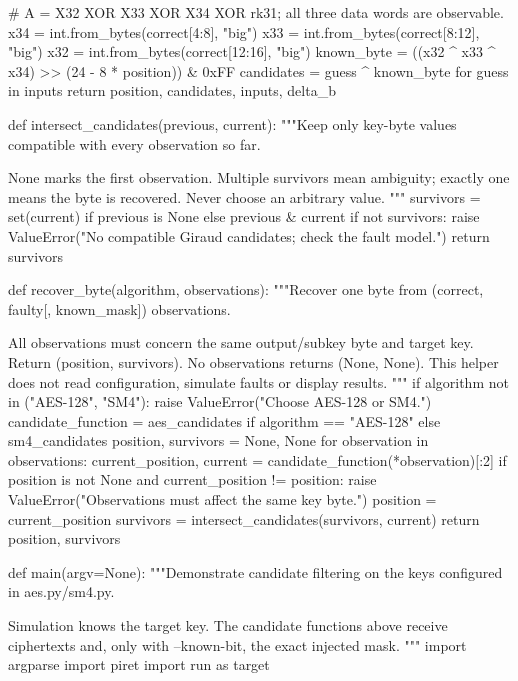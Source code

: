 \begin{lightcode}[numbers=left,firstnumber=1]
    # A = X32 XOR X33 XOR X34 XOR rk31; all three data words are observable.
    x34 = int.from_bytes(correct[4:8], "big")
    x33 = int.from_bytes(correct[8:12], "big")
    x32 = int.from_bytes(correct[12:16], "big")
    known_byte = ((x32 ^ x33 ^ x34) >> (24 - 8 * position)) & 0xFF
    candidates = {guess ^ known_byte for guess in inputs}
    return position, candidates, inputs, delta_b


def intersect_candidates(previous, current):
    """Keep only key-byte values compatible with every observation so far.

    None marks the first observation. Multiple survivors mean ambiguity;
    exactly one means the byte is recovered. Never choose an arbitrary value.
    """
    survivors = set(current) if previous is None else previous & current
    if not survivors:
        raise ValueError("No compatible Giraud candidates; check the fault model.")
    return survivors


def recover_byte(algorithm, observations):
    """Recover one byte from (correct, faulty[, known_mask]) observations.

    All observations must concern the same output/subkey byte and target key.
    Return (position, survivors). No observations returns (None, None).
    This helper does not read configuration, simulate faults or display results.
    """
    if algorithm not in ("AES-128", "SM4"):
        raise ValueError("Choose AES-128 or SM4.")
    candidate_function = aes_candidates if algorithm == "AES-128" else sm4_candidates
    position, survivors = None, None
    for observation in observations:
        current_position, current = candidate_function(*observation)[:2]
        if position is not None and current_position != position:
            raise ValueError("Observations must affect the same key byte.")
        position = current_position
        survivors = intersect_candidates(survivors, current)
    return position, survivors


def main(argv=None):
    """Demonstrate candidate filtering on the keys configured in aes.py/sm4.py.

    Simulation knows the target key. The candidate functions above receive
    ciphertexts and, only with --known-bit, the exact injected mask.
    """
    import argparse
    import piret
    import run as target


\end{lightcode}
